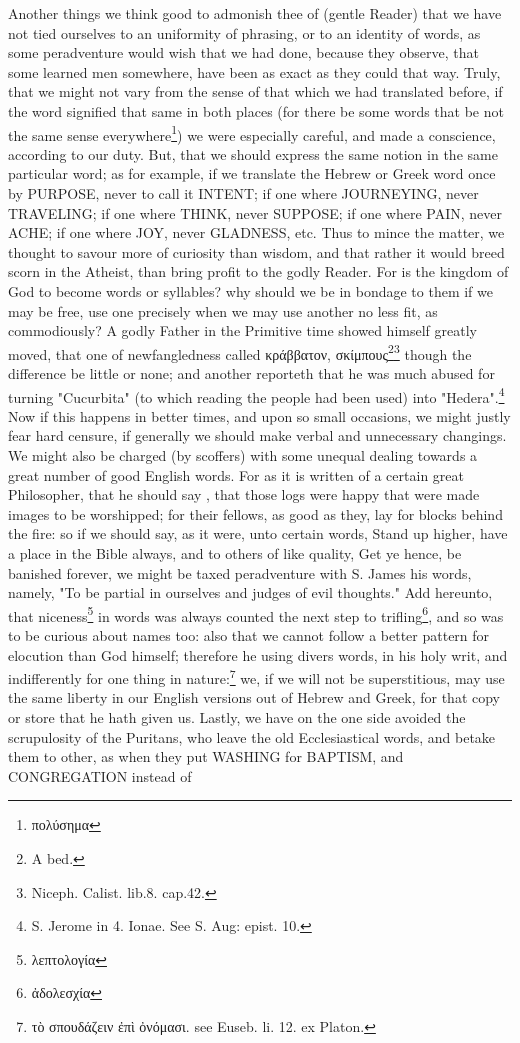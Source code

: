 Another things we think good to admonish thee of (gentle Reader) that we have not tied ourselves to an uniformity of phrasing, or to an identity of words, as some peradventure would wish that we had done, because they observe, that some learned men somewhere, have been as exact as they could that way. Truly, that we might not vary from the sense of that which we had translated before, if the word signified that same in both places (for there be some words that be not the same sense everywhere\footnote{\foreignlanguage{greek}{πολύσημα}}) we were especially careful, and made a conscience, according to our duty. But, that we should express the same notion in the same particular word; as for example, if we translate the Hebrew or Greek word once by PURPOSE, never to call it INTENT; if one where JOURNEYING, never TRAVELING; if one where THINK, never SUPPOSE; if one where PAIN, never ACHE; if one where JOY, never GLADNESS, etc. Thus to mince the matter, we thought to savour more of curiosity than wisdom, and that rather it would breed scorn in the Atheist, than bring profit to the godly Reader. For is the kingdom of God to become words or syllables? why should we be in bondage to them if we may be free, use one precisely when we may use another no less fit, as commodiously? A godly Father in the Primitive time showed himself greatly moved, that one of newfangledness called \foreignlanguage{greek}{κράββατον, σκίμπους}\footnote{A bed.}\footnote{Niceph. Calist. lib.8. cap.42.} though the difference be little or none; and another reporteth that he was much abused for turning "Cucurbita" (to which reading the people had been used) into "Hedera".\footnote{S. Jerome in 4. Ionae. See S. Aug: epist. 10.} Now if this happens in better times, and upon so small occasions, we might justly fear hard censure, if generally we should make verbal and unnecessary changings. We might also be charged (by scoffers) with some unequal dealing towards a great number of good English words. For as it is written of a certain great Philosopher, that he should say , that those logs were happy that were made images to be worshipped; for their fellows, as good as they, lay for blocks behind the fire: so if we should say, as it were, unto certain words, Stand up higher, have a place in the Bible always, and to others of like quality, Get ye hence, be banished forever, we might be taxed peradventure with S. James his words, namely, "To be partial in ourselves and judges of evil thoughts." Add hereunto, that niceness\footnote{\foreignlanguage{greek}{λεπτολογία}} in words was always counted the next step to trifling\footnote{\foreignlanguage{greek}{ἀδολεσχία}}, and so was to be curious about names too: also that we cannot follow a better pattern for elocution than God himself; therefore he using divers words, in his holy writ, and indifferently for one thing in nature:\footnote{\foreignlanguage{greek}{τὸ σπουδάζειν ἐπὶ ὀνόμασι}. see Euseb. li. 12. ex Platon.} we, if we will not be superstitious, may use the same liberty in our English versions out of Hebrew and Greek, for that copy or store that he hath given us. Lastly, we have on the one side avoided the scrupulosity of the Puritans, who leave the old Ecclesiastical words, and betake them to other, as when they put WASHING for BAPTISM, and CONGREGATION instead of 